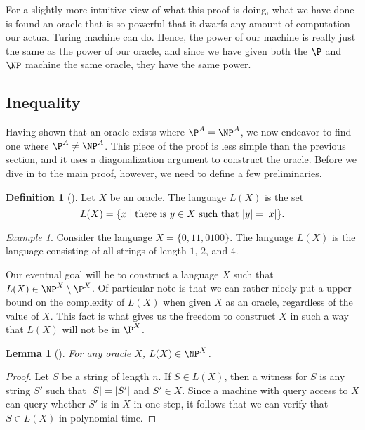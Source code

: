 \documentclass[english,12pt]{reedthesis}
\theoremstyle{plain}
\newtheorem{lemma}[lemma]{Lemma}
\theoremstyle{definition}
\newtheorem{defn}[defn]{Definition}
\theoremstyle{remark}
\newtheorem{example}{Example}[thm]
\DeclarePairedDelimiter{\abs}{\lvert}{\rvert}
\begin{document}
For a slightly more intuitive view of what this proof is doing, what we have
done is found an oracle that is so powerful that it dwarfs any amount of
computation our actual Turing machine can do. Hence, the power of our machine is
really just the same as the power of our oracle, and since we have given both
the $\P$ and $\NP$ machine the same oracle, they have the same power.

\subsection{Inequality}

Having shown that an oracle exists where $\P^{A} = \NP^{A}$, we now endeavor to
find one where $\P^{A} \ne \NP^{A}$. This piece of the proof is less simple than
the previous section, and it uses a diagonalization argument to construct the
oracle. Before we dive in to the main proof, however, we need to define a few
preliminaries.

\begin{defn}[{\cite[436]{BGS75}}]\label{def:l(x)}
  Let $X$ be an oracle. The language $L(X)$ is the set
  \begin{equation*}
    L(X) = \{x \mid \text{there is } y \in X \text{ such that } \abs{y} = \abs{x}\}.
  \end{equation*}
\end{defn}

\begin{example}\label{ex:l(x)-simple}
  Consider the language $X = \{0, 11, 0100\}$. The language $L(X)$ is the
  language consisting of all strings of length $1$, $2$, and $4$.
\end{example}

Our eventual goal will be to construct a language $X$ such that
$L(X) \in \NP^{X} \setminus \P^{X}$. Of particular note is that we can rather nicely put a
upper bound on the complexity of $L(X)$ when given $X$ as an oracle, regardless
of the value of $X$. This fact is what gives us the freedom to construct $X$ in
such a way that $L(X)$ will not be in $\P^{X}$.

\begin{lemma}[{\cite[436]{BGS75}}]\label{lem:l(x)-in-np}
  For any oracle $X$, $L(X) \in \NP^{X}$.
\end{lemma}

\begin{proof}
  Let $S$ be a string of length $n$. If $S \in L(X)$, then a witness for $S$ is
  any string $S'$ such that $\abs{S} = \abs{S'}$ and $S' \in X$. Since a machine
  with query access to $X$ can query whether $S'$ is in $X$ in one step, it
  follows that we can verify that $S \in L(X)$ in polynomial time.
\end{proof}
\end{document}
